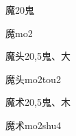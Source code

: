 \begin{Entry}{魔}{20}{⿁}
  \begin{Phonetics}{魔}{mo2}
  \end{Phonetics}
\end{Entry}

\begin{Entry}{魔头}{20,5}{⿁、⼤}
  \begin{Phonetics}{魔头}{mo2tou2}
  \end{Phonetics}
\end{Entry}

\begin{Entry}{魔术}{20,5}{⿁、⽊}
  \begin{Phonetics}{魔术}{mo2shu4}
  \end{Phonetics}
\end{Entry}



